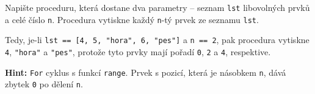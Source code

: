\question[50]
Napište proceduru, která dostane dva parametry -- seznam \texttt{lst}
libovolných prvků a celé číslo \texttt{n}. Procedura vytiskne každý
\texttt{n}-tý prvek ze seznamu \texttt{lst}.

Tedy, je-li \texttt{lst == [4, 5, "hora", 6, "pes"]} a \texttt{n == 2}, pak
procedura vytiskne \texttt{4}, \texttt{"hora"} a \texttt{"pes"}, protože tyto
prvky mají pořadí \texttt{0}, \texttt{2} a \texttt{4}, respektive.

\textbf{Hint:} \texttt{For} cyklus s funkcí \texttt{range}. Prvek s pozicí,
která je násobkem \texttt{n}, dává zbytek \texttt{0} po dělení \texttt{n}.